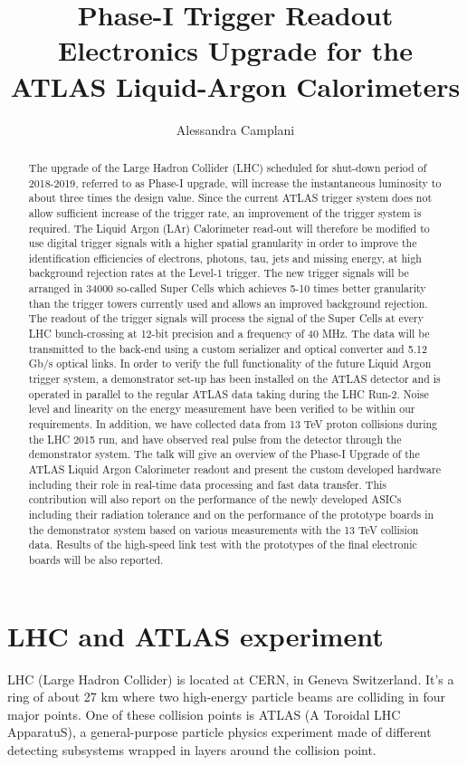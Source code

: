 \documentclass{llncs}
\title{Phase-I Trigger Readout Electronics Upgrade for the ATLAS Liquid-Argon Calorimeters}
\author{Alessandra Camplani\inst{1} \inst{2}}
\institute{Universt\'a degli Studi di Milano
\and INFN Milano}
\begin{document}
\maketitle

\begin{abstract}
The upgrade of the Large Hadron Collider (LHC) scheduled for shut-down period of 2018-2019, referred to as Phase-I upgrade, will increase the instantaneous luminosity to about three times the design value. Since the current ATLAS trigger system does not allow sufficient increase of the trigger rate, an improvement of the trigger system is required. The Liquid Argon (LAr) Calorimeter read-out will therefore be modified to use digital trigger signals with a higher spatial granularity in order to improve the identification efficiencies of electrons, photons, tau, jets and missing energy, at high background rejection rates at the Level-1 trigger. The new trigger signals will be arranged in 34000 so-called Super Cells which achieves 5-10 times better granularity than the trigger towers currently used and allows an improved background rejection. The readout of the trigger signals will process the signal of the Super Cells at every LHC bunch-crossing at 12-bit precision and a frequency of 40 MHz. The data will be transmitted to the back-end using a custom serializer and optical converter and 5.12 Gb/s optical links. In order to verify the full functionality of the future Liquid Argon trigger system, a demonstrator set-up has been installed on the ATLAS detector and is operated in parallel to the regular ATLAS data taking during the LHC Run-2. Noise level and linearity on the energy measurement have been verified to be within our requirements. In addition, we have collected data from 13 TeV proton collisions during the LHC 2015 run, and have observed real pulse from the detector through the demonstrator system. The talk will give an overview of the Phase-I Upgrade of the ATLAS Liquid Argon Calorimeter readout and present the custom developed hardware including their role in real-time data processing and fast data transfer. This contribution will also report on the performance of the newly developed ASICs including their radiation tolerance and on the performance of the prototype boards in the demonstrator system based on various measurements with the 13 TeV collision data. Results of the high-speed link test with the prototypes of the final electronic boards will be also reported.
\end{abstract}

\section{LHC and ATLAS experiment}
LHC (Large Hadron Collider) is located at CERN, in Geneva Switzerland. It's a ring of about 27 km where two high-energy particle beams are colliding in four major points. One of these collision points is ATLAS (A Toroidal LHC ApparatuS), a general-purpose particle physics experiment made of different detecting subsystems wrapped in layers around the collision point.
\end{document}
